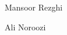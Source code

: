 \documentclass[journal]{IEEEtran}
\begin{document}
	
	\begin{IEEEbiography}{Mansoor Rezghi}
		
	\end{IEEEbiography}
	
	\begin{IEEEbiography}{Ali Noroozi}
		
	\end{IEEEbiography}
	
	
	
	
	
	
	
	
	
\end{document}
